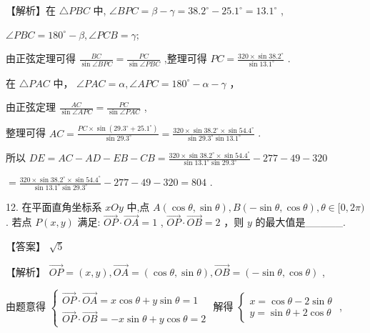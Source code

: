 \documentclass[10pt]{article}
\begin{document}
【解析】在 \(\bigtriangleup {PBC}\) 中, \(\angle {BPC} = \beta  - \gamma  = {38.2}^{ \circ  } - {25.1}^{ \circ  } = {13.1}^{ \circ  }\) ,

\(\angle {PBC} = {180}^{ \circ  } - \beta ,\angle {PCB} = \gamma ;\)

由正弦定理可得 \(\frac{BC}{\sin \angle {BPC}} = \frac{PC}{\sin \angle {PBC}}\) ,整理可得 \({PC} = \frac{{320} \times  \sin {38.2}^{ \circ  }}{\sin {13.1}^{ \circ  }}\) .

在 \(\bigtriangleup  {PAC}\) 中， \(\angle {PAC} = \alpha ,\angle {APC} = {180}^{ \circ  } - \alpha  - \gamma\) ，

由正弦定理 \(\frac{AC}{\sin \angle {APC}} = \frac{PC}{\sin \angle {PAC}}\) ,

整理可得 \({AC} = \frac{{PC} \times  \sin \left( {{29.3}^{ \circ  } + {25.1}^{ \circ  }}\right) }{\sin {29.3}^{ \circ  }} = \frac{{320} \times  \sin {38.2}^{ \circ  } \times  \sin {54.4}^{ \circ  }}{\sin {29.3}^{ \circ  }\sin {13.1}^{ \circ  }}\) .

所以 \({DE} = {AC} - {AD} - {EB} - {CB} = \frac{{320} \times  \sin {38.2}^{ \circ  } \times  \sin {54.4}^{ \circ  }}{\sin {13.1}^{ \circ  }\sin {29.3}^{ \circ  }} - {277} - {49} - {320}\)

\(= \frac{{320} \times  \sin {38.2}^{ \circ  } \times  \sin {54.4}^{ \circ  }}{\sin {13.1}^{ \circ  }\sin {29.3}^{ \circ  }} - {277} - {49} - {320} = {804}\) .

12. 在平面直角坐标系 \({xOy}\) 中,点 \(A\left( {\cos \theta ,\sin \theta }\right) ,B\left( {-\sin \theta ,\cos \theta }\right) ,\theta  \in  \lbrack 0,{2\pi })\) . 若点 \(P\left( {x,y}\right)\) 满足: \(\overrightarrow{OP} \cdot  \overrightarrow{OA} = 1\) , \(\overrightarrow{OP} \cdot  \overrightarrow{OB} = 2\) ，则 \(y\) 的最大值是\_\_\_\_\_.

【答案】 \(\sqrt{5}\)

【解析】 \(\overrightarrow{OP} = \left( {x,y}\right) ,\overrightarrow{OA} = \left( {\cos \theta ,\sin \theta }\right) ,\overrightarrow{OB} = \left( {-\sin \theta ,\cos \theta }\right)\) ,

由题意得 \(\left\{  \begin{array}{l} \overrightarrow{OP} \cdot  \overrightarrow{OA} = x\cos \theta  + y\sin \theta  = 1 \\  \overrightarrow{OP} \cdot  \overrightarrow{OB} =  - x\sin \theta  + y\cos \theta  = 2 \end{array}\right.\) 解得 \(\left\{  \begin{array}{l} x = \cos \theta  - 2\sin \theta \\  y = \sin \theta  + 2\cos \theta  \end{array}\right.\) ,
\end{document}
